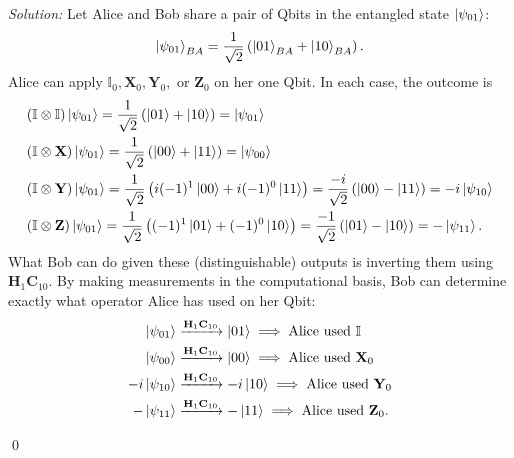 \documentclass{book}
\theoremstyle{definition}
\newcommand{\nn}{\nonumber}
\newcommand{\X}{\mathbf{X}}
\newcommand{\f}[2]{\frac{#1}{#2}}
\newcommand{\lp}{\left(}
\newcommand{\rp}{\right)}
\newcommand{\Id}{\mathbb{I}}
\newcommand{\Z}{\mathbf{Z}}
\newcommand{\had}{\mathbf{H}}
\newcommand{\Y}{\mathbf{Y}}
\begin{document}
\noindent \textit{Solution:} 
Let Alice and Bob share a pair of Qbits in the entangled state $\ket{\psi_{01}}$:
\begin{align}
\ket{\psi_{01}}_{BA} = \f{1}{\sqrt{2}}\lp \ket{01}_{BA} + \ket{10}_{BA} \rp.
\end{align}
Alice can apply $\Id_0, \X_0, \Y_0,$ or $\Z_0$ on her one Qbit. In each case, the outcome is 
\begin{align}
&(\Id \otimes \Id)\ket{\psi_{01}} = \f{1}{\sqrt{2}}\lp \ket{01} + \ket{10} \rp = \ket{\psi_{01}}\nn\\
&(\Id \otimes \X)\ket{\psi_{01}} = \f{1}{\sqrt{2}}\lp \ket{00} + \ket{11} \rp = \ket{\psi_{00}}\nn\\
&(\Id \otimes \Y)\ket{\psi_{01}} = \f{1}{\sqrt{2}}\lp i(-1)^1\ket{00} + i(-1)^0\ket{11} \rp = \f{-i}{\sqrt{2}}\lp \ket{00}- \ket{11} \rp = -i\ket{\psi_{10}}\nn\\
&(\Id \otimes \Z)\ket{\psi_{01}} = \f{1}{\sqrt{2}}\lp (-1)^1\ket{01} + (-1)^0\ket{10} \rp = \f{-1}{\sqrt{2}}\lp \ket{01} - \ket{10} \rp = -\ket{\psi_{11}}.
\end{align}
What Bob can do given these (distinguishable) outputs is inverting them using $\had_1 \mathbf{C}_{10}$. By making measurements in the computational basis, Bob can determine exactly what operator Alice has used on her Qbit:
\begin{align}
\ket{\psi_{01}}  &\xrightarrow{\had_1\mathbf{C}_{10}} \ket{01} \implies \text{Alice used } \Id\nn\\
\ket{\psi_{00}}  &\xrightarrow{\had_1\mathbf{C}_{10}} \ket{00}\implies \text{Alice used } \X_0 \nn\\
-i\ket{\psi_{10}}  &\xrightarrow{\had_1\mathbf{C}_{10}} -i\ket{10}\implies \text{Alice used } \Y_0 \nn\\
-\ket{\psi_{11}}  &\xrightarrow{\had_1\mathbf{C}_{10}} -\ket{11}\implies \text{Alice used } \Z_0. 
\end{align}



\qed






















\newpage
\end{document}
